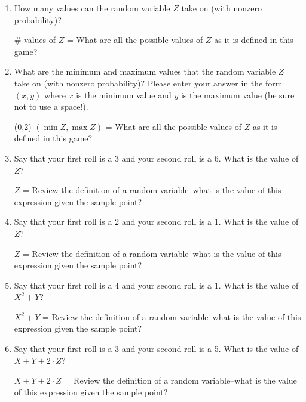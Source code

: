 \documentclass[11pt, preview]{standalone} %
\begin{document}
\begin{enumerate}
\begin{enumerate}
\item How many values can the random variable $Z$ take on (with nonzero probability)?
\begin{Freeform}{3}
\# values of $Z$ = 
\Hint What are all the possible values of $Z$ as it is defined in this game?
\end{Freeform}
\item What are the minimum and maximum values that the random variable $Z$ take on  (with nonzero probability)? Please enter your answer in the form $(x,y)$ where $x$ is the minimum value and $y$ is the maximum value (be sure not to use a space!).
\begin{Freeform}{(0,2)}
$(\min Z, \max Z)$ = 
\Hint What are all the possible values of $Z$ as it is defined in this game?
\end{Freeform}
\item Say that your first roll is a 3 and your second roll is a 6. What is the value of $Z$?
\begin{Freeform}{2}
$Z$ = 
\Hint Review the definition of a random variable--what is the value of this expression given the sample point?
\end{Freeform}
\item Say that your first roll is a 2 and your second roll is a 1. What is the value of $Z$?
\begin{Freeform}{1}
$Z$ = 
\Hint Review the definition of a random variable--what is the value of this expression given the sample point?
\end{Freeform}
\item Say that your first roll is a 4 and your second roll is a 1. What is the value of $X^2+Y$?
\begin{Freeform}{29}
$X^2+Y$ = 
\Hint Review the definition of a random variable--what is the value of this expression given the sample point?
\end{Freeform}
\item Say that your first roll is a 3 and your second roll is a 5. What is the value of $X+Y+2\cdot Z$?
\begin{Freeform}{27}
$X+Y+2\cdot Z$ = 
\Hint Review the definition of a random variable--what is the value of this expression given the sample point?
\end{Freeform}

\end{enumerate}
\end{enumerate}
\end{document}
